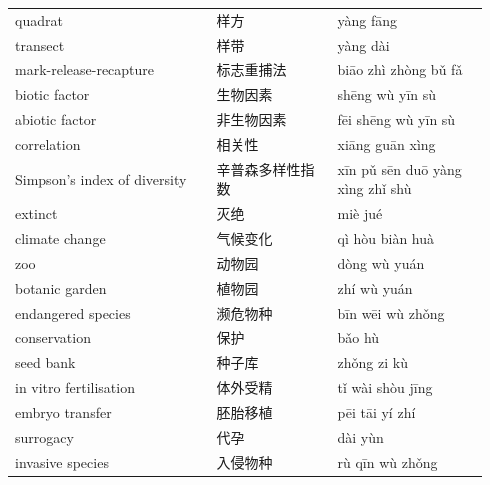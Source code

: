 \documentclass[11pt]{article}
\begin{document}
\begin{longtable}{@{}p{0.40\linewidth}p{0.24\linewidth}p{0.30\linewidth}@{}}
quadrat & 样方 & yàng fāng \\
transect & 样带 & yàng dài \\
mark-release-recapture & 标志重捕法 & biāo zhì zhòng bǔ fǎ \\
biotic factor & 生物因素 & shēng wù yīn sù \\
abiotic factor & 非生物因素 & fēi shēng wù yīn sù \\
correlation & 相关性 & xiāng guān xìng \\
Simpson's index of diversity & 辛普森多样性指数 & xīn pǔ sēn duō yàng xìng zhǐ shù \\
extinct & 灭绝 & miè jué \\
climate change & 气候变化 & qì hòu biàn huà \\
zoo & 动物园 & dòng wù yuán \\
botanic garden & 植物园 & zhí wù yuán \\
endangered species & 濒危物种 & bīn wēi wù zhǒng \\
conservation & 保护 & bǎo hù \\
seed bank & 种子库 & zhǒng zi kù \\
in vitro fertilisation & 体外受精 & tǐ wài shòu jīng \\
embryo transfer & 胚胎移植 & pēi tāi yí zhí \\
surrogacy & 代孕 & dài yùn \\
invasive species & 入侵物种 & rù qīn wù zhǒng \\
\end{longtable}
\end{document}
